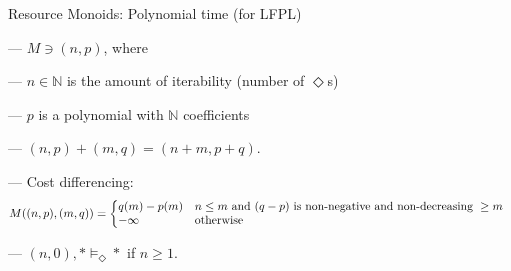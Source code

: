 \documentclass[xetex,serif,mathserif,aspectratio=169]{beamer}
\newcommand{\youtem}{\quad \textcolor{titlered!80}{---} \quad}
\newcommand{\HEAD}[1]{\textcolor{titlered}{#1}}
\begin{document}
\begin{frame}
  \HEAD{Resource Monoids: } Polynomial time (for LFPL)

  \bigskip

  \youtem $M \ni (n, p)$, where \\

  \smallskip

  \quad \youtem $n \in \mathbb{N}$ is the amount of iterability (number of $\Diamond$s)

  \smallskip

  \quad \youtem $p$ is a polynomial with $\mathbb{N}$ coefficients

  \smallskip

  \quad \youtem $(n,p)+(m,q) = (n+m,p+q)$.

  \smallskip

  \quad \youtem Cost differencing:
  \begin{displaymath}
    M((n,p),(m,q)) = \left\{\begin{array}{@{}ll}
                              q(m) - p(m) & n \leq m\textrm{ and }(q-p)\textrm{ is non-negative and non-decreasing }\geq m \\
                              -\infty      & \textrm{otherwise}
                            \end{array}\right.
                        \end{displaymath}

  \bigskip

  \youtem $(n, 0), \texttt{*} \models_\Diamond *$ if $n \geq 1$.
\end{frame}
\end{document}
